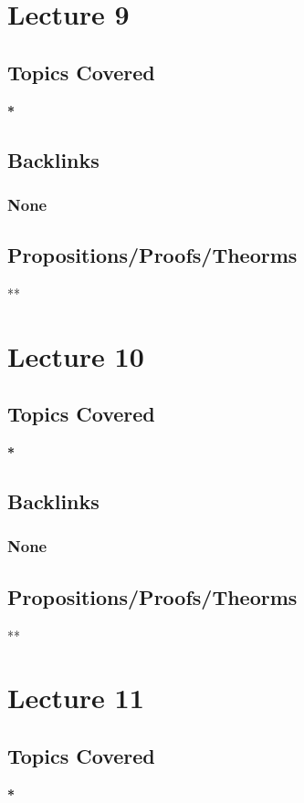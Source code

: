 \documentclass[11pt]{article}
\begin{document}
\section*{Lecture 9}
\label{sec:org03654b8}
\subsection*{Topics Covered}
\label{sec:orge47344e}
\textbf{*}
\subsection*{Backlinks}
\label{sec:org1777b74}
\subsubsection*{None}
\label{sec:org551ebfa}
\subsection*{Propositions/Proofs/Theorms}
\label{sec:org68b4477}
**

\section*{Lecture 10}
\label{sec:orgfdfafb1}
\subsection*{Topics Covered}
\label{sec:org36f0ccf}
\textbf{*}
\subsection*{Backlinks}
\label{sec:orgfab29db}
\subsubsection*{None}
\label{sec:orgfb5ac5b}
\subsection*{Propositions/Proofs/Theorms}
\label{sec:orga971be7}
**

\section*{Lecture 11}
\label{sec:orgf73c07f}
\subsection*{Topics Covered}
\label{sec:orgee55223}
\textbf{*}
\end{document}
